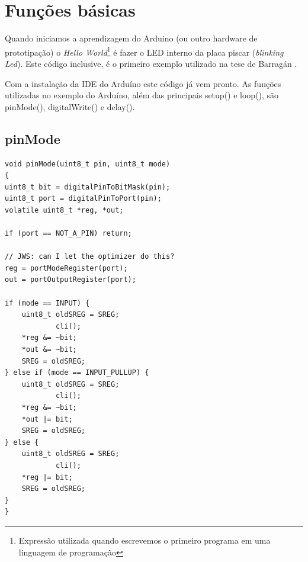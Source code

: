 \section{Funções básicas}

Quando iniciamos a aprendizagem do Arduino (ou outro hardware de prototipação) o \emph{Hello World}\footnote{Expressão utilizada quando escrevemos o primeiro programa em uma linguagem de programação} é fazer o LED interno da placa piscar (\emph{blinking Led}). Este código inclusive, é o primeiro exemplo utilizado na tese de Barragán \cite[p.~39]{Barragan2004}. 

Com a instalação da IDE do Arduíno este código já vem pronto. As funções utilizadas no exemplo do Arduíno, além das principais setup() e loop(), são pinMode(), digitalWrite() e delay().\newline

\subsection{pinMode}

 
\begin{lstlisting}
void pinMode(uint8_t pin, uint8_t mode)
{
uint8_t bit = digitalPinToBitMask(pin);
uint8_t port = digitalPinToPort(pin);
volatile uint8_t *reg, *out;

if (port == NOT_A_PIN) return;

// JWS: can I let the optimizer do this?
reg = portModeRegister(port);
out = portOutputRegister(port);

if (mode == INPUT) { 
	uint8_t oldSREG = SREG;
            cli();
	*reg &= ~bit;
	*out &= ~bit;
	SREG = oldSREG;
} else if (mode == INPUT_PULLUP) {
	uint8_t oldSREG = SREG;
            cli();
	*reg &= ~bit;
	*out |= bit;
	SREG = oldSREG;
} else {
	uint8_t oldSREG = SREG;
            cli();
	*reg |= bit;
	SREG = oldSREG;
}
}
\end{lstlisting}

